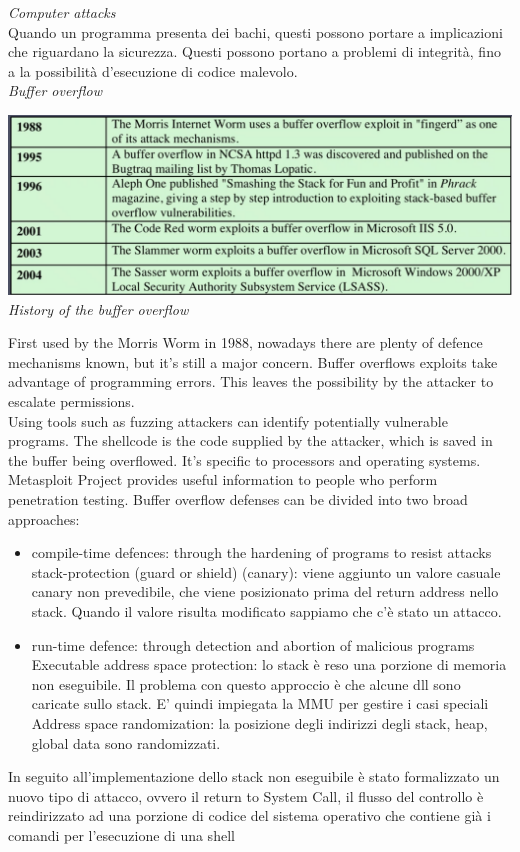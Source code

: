 \documentclass[11pt, oneside]{article}   	%
\begin{document}
 \emph{Computer attacks}\\
 Quando un programma presenta dei bachi, questi possono portare a implicazioni che riguardano la sicurezza. Questi possono portano a problemi di integrità, fino a la possibilità d'esecuzione di codice malevolo.\\
 \emph{Buffer overflow}
  \begin{center}
\includegraphics[scale=0.5]{hist}\\
\emph{History of the buffer overflow}
\end{center}
First used by the Morris Worm in 1988, nowadays there are plenty of defence mechanisms known, but it's still a major concern. Buffer overflows exploits take advantage of programming errors. This leaves the possibility by the attacker to escalate permissions.\\
Using tools such as fuzzing attackers can identify potentially vulnerable programs. The shellcode is the code supplied by the attacker, which is saved in the buffer being overflowed. It's specific to processors and operating systems. Metasploit Project provides useful information to people who perform penetration testing. Buffer overflow defenses can be divided into two broad approaches:
\begin{itemize}
\item compile-time defences: through the hardening of programs to resist attacks\\
stack-protection (guard or shield) (canary): viene aggiunto un valore casuale canary non prevedibile, che viene posizionato prima del return address nello stack. Quando il valore risulta modificato sappiamo che c'è stato un attacco.\\
\item run-time defence: through detection and abortion of malicious programs\\
Executable address space protection: lo stack è reso una porzione di memoria non eseguibile. Il problema con questo approccio è che alcune dll sono caricate sullo stack. E' quindi impiegata la MMU per gestire i casi speciali\\
Address space randomization: la posizione degli indirizzi degli stack, heap, global data sono randomizzati.
\end{itemize}
In seguito all'implementazione dello stack non eseguibile è stato formalizzato un nuovo tipo di attacco, ovvero il return to System Call, il flusso del controllo è reindirizzato ad una porzione di codice del sistema operativo che contiene già i comandi per l'esecuzione di una shell
\end{document}
